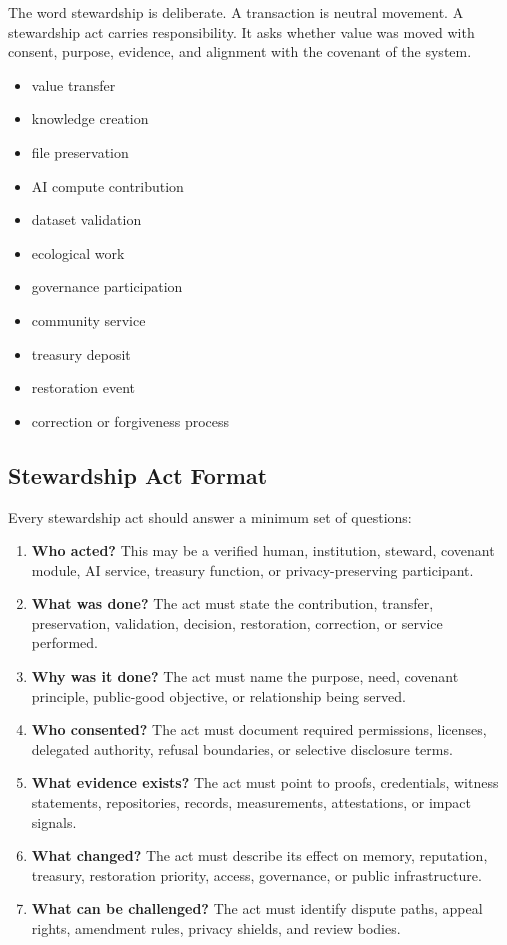 \documentclass[12pt]{article}
\begin{document}
The word stewardship is deliberate. A transaction is neutral movement. A stewardship act carries responsibility. It asks whether value was moved with consent, purpose, evidence, and alignment with the covenant of the system.

\begin{itemize}
  \item value transfer
  \item knowledge creation
  \item file preservation
  \item AI compute contribution
  \item dataset validation
  \item ecological work
  \item governance participation
  \item community service
  \item treasury deposit
  \item restoration event
  \item correction or forgiveness process
\end{itemize}

\subsection{Stewardship Act Format}

Every stewardship act should answer a minimum set of questions:

\begin{enumerate}
  \item \textbf{Who acted?} This may be a verified human, institution, steward, covenant module, AI service, treasury function, or privacy-preserving participant.
  \item \textbf{What was done?} The act must state the contribution, transfer, preservation, validation, decision, restoration, correction, or service performed.
  \item \textbf{Why was it done?} The act must name the purpose, need, covenant principle, public-good objective, or relationship being served.
  \item \textbf{Who consented?} The act must document required permissions, licenses, delegated authority, refusal boundaries, or selective disclosure terms.
  \item \textbf{What evidence exists?} The act must point to proofs, credentials, witness statements, repositories, records, measurements, attestations, or impact signals.
  \item \textbf{What changed?} The act must describe its effect on memory, reputation, treasury, restoration priority, access, governance, or public infrastructure.
  \item \textbf{What can be challenged?} The act must identify dispute paths, appeal rights, amendment rules, privacy shields, and review bodies.
\end{enumerate}
\end{document}
